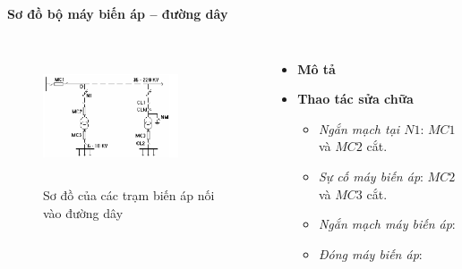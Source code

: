 \documentclass{beamer}
\begin{document}
\begin{frame}{\textbf{Sơ đồ bộ máy biến áp -- đường dây}}
\begin{columns}
\begin{figure}[h]
\includegraphics[width=4cm, height=4cm]{sdbmba}
\caption{Sơ đồ của các trạm biến áp nối vào đường dây}
\end{figure}

\begin{itemize}
\item \textbf{Mô tả}
\item  \textbf{Thao tác sửa chữa}
\begin{itemize}
\item<1-> \emph{Ngắn mạch tại $N1$}: $MC1$ và $MC2$ cắt.
\item<1-> \emph{Sự cố máy biến áp}: $MC2$ và $MC3$ cắt.
\item<1-> \emph{Ngắn mạch máy biến áp}: 
\item<1-> \emph{Đóng máy biến áp}:   
\end{itemize}
\end{itemize}
\end{columns}
\end{frame}
\end{document}
